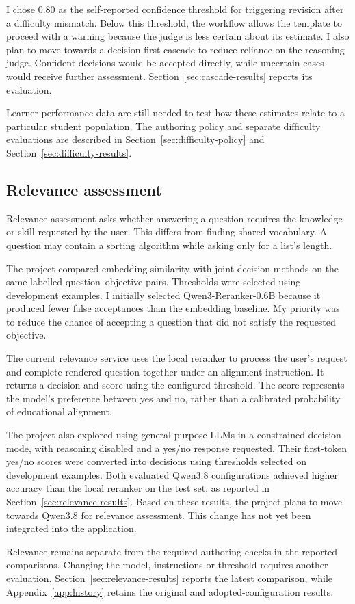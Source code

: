 I chose 0.80 as the self-reported confidence threshold for triggering revision after a difficulty mismatch. Below this threshold, the workflow allows the template to proceed with a warning because the judge is less certain about its estimate. I also plan to move towards a decision-first cascade to reduce reliance on the reasoning judge. Confident decisions would be accepted directly, while uncertain cases would receive further assessment. Section~\ref{sec:cascade-results} reports its evaluation.

Learner-performance data are still needed to test how these estimates relate to a particular student population. The authoring policy and separate difficulty evaluations are described in Section~\ref{sec:difficulty-policy} and Section~\ref{sec:difficulty-results}.

\subsection{Relevance assessment}\label{sec:relevance-design}

Relevance assessment asks whether answering a question requires the knowledge or skill requested by the user. This differs from finding shared vocabulary. A question may contain a sorting algorithm while asking only for a list's length.

The project compared embedding similarity with joint decision methods on the same labelled question--objective pairs. Thresholds were selected using development examples. I initially selected Qwen3-Reranker-0.6B because it produced fewer false acceptances than the embedding baseline. My priority was to reduce the chance of accepting a question that did not satisfy the requested objective.

The current relevance service uses the local reranker to process the user's request and complete rendered question together under an alignment instruction. It returns a decision and score using the configured threshold. The score represents the model's preference between yes and no, rather than a calibrated probability of educational alignment.

The project also explored using general-purpose LLMs in a constrained decision mode, with reasoning disabled and a yes/no response requested. Their first-token yes/no scores were converted into decisions using thresholds selected on development examples. Both evaluated Qwen3.8 configurations achieved higher accuracy than the local reranker on the test set, as reported in Section~\ref{sec:relevance-results}. Based on these results, the project plans to move towards Qwen3.8 for relevance assessment. This change has not yet been integrated into the application.

Relevance remains separate from the required authoring checks in the reported comparisons. Changing the model, instructions or threshold requires another evaluation. Section~\ref{sec:relevance-results} reports the latest comparison, while Appendix~\ref{app:history} retains the original and adopted-configuration results.
